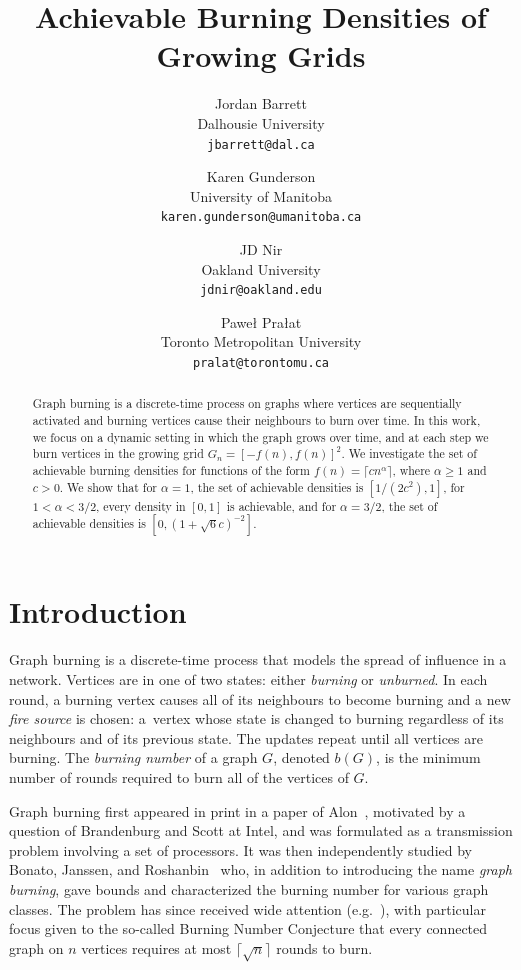 \documentclass[12pt]{article}
\title{Achievable Burning Densities of Growing Grids}
\author{
Jordan Barrett\\
Dalhousie University\\
\texttt{jbarrett@dal.ca}
\and 
Karen Gunderson\\
University of Manitoba\\
\texttt{karen.gunderson@umanitoba.ca}
\and
JD Nir\\
Oakland University \\
\texttt{jdnir@oakland.edu}
\and
Pawe\l{} Pra\l{}at\\
Toronto Metropolitan University\\
\texttt{pralat@torontomu.ca}
}
\theoremstyle{remark}
\begin{document}
\maketitle

\begin{abstract}
Graph burning is a discrete-time process on graphs where vertices are sequentially activated and burning vertices cause their neighbours to burn over time. In this work, we focus on a dynamic setting in which the graph grows over time, and at each step we burn vertices in the growing grid $G_n = [-f(n),f(n)]^2$. We investigate the set of achievable burning densities for functions of the form $f(n)=\lceil cn^\alpha\rceil$, where $\alpha \ge 1$ and $c>0$. We show that for $\alpha=1$, the set of achievable densities is $[1/(2c^2),1]$, for $1<\alpha<3/2$, every density in $[0,1]$ is achievable, and for $\alpha=3/2$, the set of achievable densities is $[0,(1+\sqrt{6}c)^{-2}]$.
\end{abstract}

\section{Introduction}\label{sec:intro}

Graph burning is a discrete-time process that models the spread of influence in a network. Vertices are in one of two states: either \emph{burning} or \emph{unburned}. In each round, a burning vertex causes all of its neighbours to become burning and a new \emph{fire source} is chosen: a~vertex whose state is changed to burning regardless of its neighbours and of its previous state. The updates repeat until all vertices are burning. The \emph{burning number} of a graph $G$, denoted $b(G)$, is the minimum number of rounds required to burn all of the vertices of $G$.  

Graph burning first appeared in print in a paper of Alon~\cite{nA92}, motivated by a question of Brandenburg and Scott at Intel, and was formulated as a transmission problem involving a set of processors. It was then independently studied by Bonato, Janssen, and Roshanbin~\cite{BJR14,BJR16,eR16} who, in addition to introducing the name \emph{graph burning}, gave bounds and characterized the burning number for various graph classes. The problem has since received wide attention (e.g.~\cite{BBBCKPR21,BBJRR18,DEP24,LL16,MPR17,MPR18,NT22}), with particular focus given to the so-called Burning Number Conjecture that every connected graph on $n$ vertices requires at most $\lceil \sqrt{n} \rceil$ rounds to burn.
\end{document}

